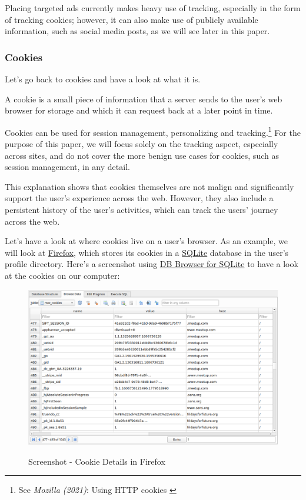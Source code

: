 Placing targeted ads currently makes heavy use of tracking, especially in the form of tracking cookies; however, it can also make use of publicly available information, such as social media posts, as we will see later in this paper.

\subsubsection{Cookies}

Let's go back to cookies and have a look at what it is.

A cookie is a small piece of information that a server sends to the user's web browser for storage and which it can request back at a later point in time.

Cookies can be used for session management, personalizing and tracking.\footnote{See \textit{Mozilla (2021)}: Using HTTP cookies \cite{usingCookies}} For the purpose of this paper, we will focus solely on the tracking aspect, especially across sites, and do not cover the more benign use cases for cookies, such as session management, in any detail.

This explanation shows that cookies themselves are not malign and significantly support the user's experience across the web. However, they also include a persistent history of the user's activities, which can track the users' journey across the web.

Let's have a look at where cookies live on a user's browser. As an example, we will look at \href{https://www.mozilla.org/en-US/firefox/new/}{Firefox}, which stores its cookies in a \href{https://www.sqlite.org/index.html}{SQLite} database in the user's profile directory. Here's a screenshot using \href{https://sqlitebrowser.org/}{DB Browser for SQLite} to have a look at the cookies on our computer:

\begin{figure}[H]
\centering
\caption{Screenshot - Cookie Details in Firefox}
\includegraphics[width=\linewidth]{images/cookie-sqlite.png}
\label{fig:cookies}
\end{figure}


